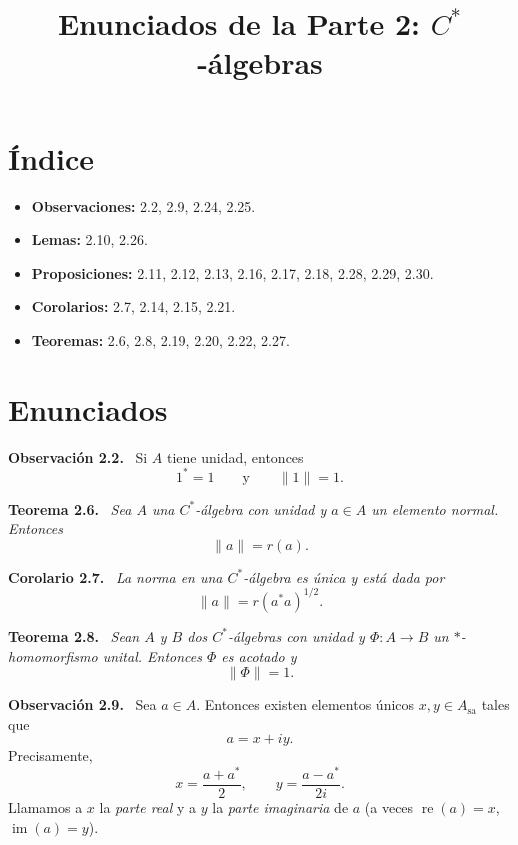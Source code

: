 \documentclass[11pt]{article}
\title{Enunciados de la Parte 2: $C^*$-álgebras}
\author{}
\date{}
\newcommand{\Asa}{A_{\mathrm{sa}}}
\newenvironment{teorema}[1]
  {\par\medskip\noindent\textbf{Teorema #1.}\ \itshape}
  {\par\medskip}
\newenvironment{corolario}[1]
  {\par\medskip\noindent\textbf{Corolario #1.}\ \itshape}
  {\par\medskip}
\newenvironment{observacion}[1]
  {\par\medskip\noindent\textbf{Observación #1.}\ }
  {\par\medskip}
\begin{document}
\maketitle

\section*{Índice}
\begin{itemize}[leftmargin=*]
  \item \textbf{Observaciones:} 2.2, 2.9, 2.24, 2.25.
  \item \textbf{Lemas:} 2.10, 2.26.
  \item \textbf{Proposiciones:} 2.11, 2.12, 2.13, 2.16, 2.17, 2.18, 2.28, 2.29, 2.30.
  \item \textbf{Corolarios:} 2.7, 2.14, 2.15, 2.21.
  \item \textbf{Teoremas:} 2.6, 2.8, 2.19, 2.20, 2.22, 2.27.
\end{itemize}

\section*{Enunciados}

\begin{observacion}{2.2}
Si $A$ tiene unidad, entonces
\[
  1^*=1
  \qquad\text{y}\qquad
  \lVert 1\rVert=1.
\]
\end{observacion}

\begin{teorema}{2.6}
Sea $A$ una $C^*$-álgebra con unidad y $a\in A$ un elemento normal. Entonces
\[
  \lVert a\rVert=r(a).
\]
\end{teorema}

\begin{corolario}{2.7}
La norma en una $C^*$-álgebra es única y está dada por
\[
  \lVert a\rVert=r(a^*a)^{1/2}.
\]
\end{corolario}

\begin{teorema}{2.8}
Sean $A$ y $B$ dos $C^*$-álgebras con unidad y $\Phi:A\to B$ un $*$-homomorfismo unital. Entonces $\Phi$ es acotado y
\[
  \lVert\Phi\rVert=1.
\]
\end{teorema}

\begin{observacion}{2.9}
Sea $a\in A$. Entonces existen elementos únicos $x,y\in\Asa$ tales que
\[
  a=x+iy.
\]
Precisamente,
\[
  x=\frac{a+a^*}{2},
  \qquad
  y=\frac{a-a^*}{2i}.
\]
Llamamos a $x$ la \emph{parte real} y a $y$ la \emph{parte imaginaria} de $a$ (a veces $\operatorname{re}(a)=x$, $\operatorname{im}(a)=y$).
\end{observacion}
\end{document}
